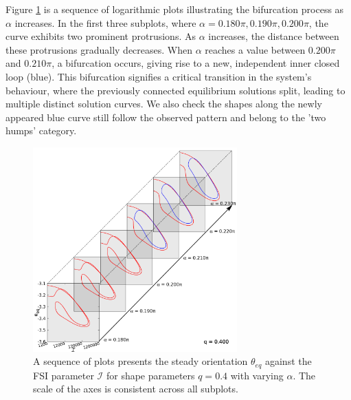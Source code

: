 \documentclass[lineno]{JFM-FLM_Au}
\begin{document}
Figure \ref{fig:9} is a sequence of logarithmic plots illustrating the bifurcation process as $\alpha$ increases. In the first three subplots, where $\alpha=0.180\pi,0.190\pi,0.200\pi$, the curve exhibits two prominent protrusions. As $\alpha$ increases, the distance between these protrusions gradually decreases. When $\alpha$ reaches a value between $0.200\pi$ and $0.210\pi$, a bifurcation occurs, giving rise to a new, independent inner closed loop (blue). This bifurcation signifies a critical transition in the system’s behaviour, where the previously connected equilibrium solutions split, leading to multiple distinct solution curves. We also check the shapes along the newly appeared blue curve still follow the observed pattern and belong to the 'two humps' category.
\begin{figure}[!h]
	\begin{center}
		\includegraphics[width=0.7\textwidth]{plot/RESLT_animation_varying_alpha_q_0.400_step_rescale_FSI/elastic_beam_I_theta_q_0.400_alpha_5.png}
		\caption{A sequence of plots presents the steady orientation $\theta_{eq}$ against the FSI parameter $\mathcal{I}$ for shape parameters $q = 0.4$ with varying $\alpha$. The scale of the axes is consistent across all subplots.}
		\label{fig:9}
	\end{center}
\end{figure}
\end{document}
